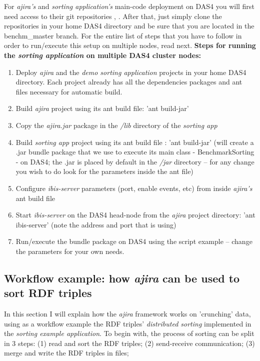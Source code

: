 For \textit{ajira's} and \textit{sorting application's} main-code deployment on DAS4 you will first need access to their git repositories \cite{arch_repo}, \cite{qpie_repo}. After that, just simply clone the repositories in your home DAS4 directory and be sure that you are located in the benchm\_master branch. For the entire list of steps that you have to follow in order to run/execute this setup on multiple nodes, read next.
\newline
\newline
\textbf{Steps for running the \textit{sorting application} on multiple DAS4 cluster nodes:}
\begin{enumerate}
	\item Deploy \textit{ajira} and the \textit{demo sorting application} projects in your home DAS4 directory. Each project already has all the dependencies packages and ant files necessary for automatic build. 
	\item Build \textit{ajira} project using its ant build file: 'ant build-jar' 
	\item Copy the \textit{ajira.jar} package in the \textit{/lib} directory of the \textit{sorting app}
	\item Build \textit{sorting app} project using its ant build file \cite{build_file}: 'ant build-jar' (will create a .jar bundle package that we use to execute its main class - BenchmarkSorting - on DAS4; the .jar is placed by default in the \textit{/jar} directory -- for any change you wish to do look for the parameters inside the ant file)
	\item Configure \textit{ibis-server} parameters (port, enable events, etc) from inside \textit{ajira's} ant build file 
	\item Start \textit{ibis-server} on the DAS4 head-node from the \textit{ajira} project directory: 'ant ibis-server' (note the address and port that is using)
	\item Run/execute the bundle package on DAS4 using the script example \cite{run_on_das4} -- change the parameters for your own needs.
\end{enumerate}

% 
\subsection{Workflow example: how \textit{ajira} can be used to sort RDF triples}

In this section I will explain how the \textit{ajira} framework works on 'crunching' data, using as a workflow example the RDF triples' \textit{distributed sorting} implemented in the \textit{sorting example application}. To begin with, the process of sorting can be split in 3 steps: (1) read and sort the RDF triples; (2) send-receive communication; (3) merge and write the RDF triples in files;

